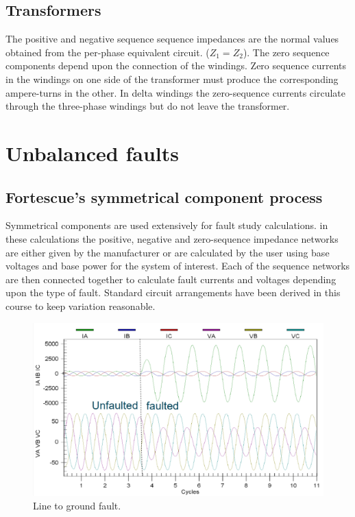 \subsection{Transformers}
The positive and negative sequence sequence impedances are the normal values obtained from the per-phase equivalent circuit. ($Z_1 = Z_2$). The zero sequence components depend upon the connection of the windings. Zero sequence currents in the windings on one side of the transformer must produce the corresponding ampere-turns in the other. In delta windings the zero-sequence currents circulate through the three-phase windings but do not leave the transformer.
\section{Unbalanced faults}
\subsection{Fortescue's symmetrical component process}
Symmetrical components are used extensively for fault study calculations. in these calculations the positive, negative and zero-sequence impedance networks are either given by the manufacturer or are calculated by the user using base voltages and base power for the system of interest. Each of the sequence networks are then connected together to calculate fault currents and voltages depending upon the type of fault. Standard circuit arrangements have been derived in this course to keep variation reasonable.
\begin{figure}[H]
	\centering
	\includegraphics[width = \textwidth]{./img/figure35.png}
	\caption{Line to ground fault.}
\end{figure}
